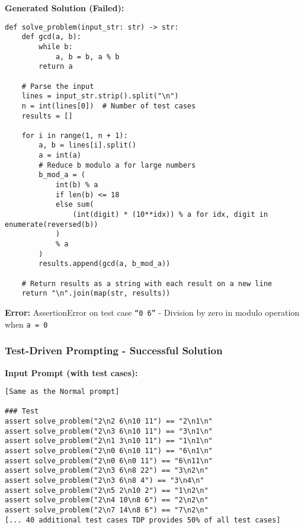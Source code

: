 \documentclass{article}
\begin{document}
\textbf{Generated Solution (Failed):}
\begin{lstlisting}
def solve_problem(input_str: str) -> str:
    def gcd(a, b):
        while b:
            a, b = b, a % b
        return a

    # Parse the input
    lines = input_str.strip().split("\n")
    n = int(lines[0])  # Number of test cases
    results = []

    for i in range(1, n + 1):
        a, b = lines[i].split()
        a = int(a)
        # Reduce b modulo a for large numbers
        b_mod_a = (
            int(b) % a
            if len(b) <= 18
            else sum(
                (int(digit) * (10**idx)) % a for idx, digit in enumerate(reversed(b))
            )
            % a
        )
        results.append(gcd(a, b_mod_a))

    # Return results as a string with each result on a new line
    return "\n".join(map(str, results))
\end{lstlisting}

\textbf{Error:} AssertionError on test case \texttt{``0 6''} - Division by zero in modulo operation when \texttt{a = 0}

\subsubsection{Test-Driven Prompting - Successful Solution}

\textbf{Input Prompt (with test cases):}
\begin{lstlisting}
[Same as the Normal prompt]

### Test
assert solve_problem("2\n2 6\n10 11") == "2\n1\n"
assert solve_problem("2\n3 6\n10 11") == "3\n1\n"
assert solve_problem("2\n1 3\n10 11") == "1\n1\n"
assert solve_problem("2\n0 6\n10 11") == "6\n1\n"
assert solve_problem("2\n0 6\n0 11") == "6\n11\n"
assert solve_problem("2\n3 6\n8 22") == "3\n2\n"
assert solve_problem("2\n3 6\n8 4") == "3\n4\n"
assert solve_problem("2\n5 2\n10 2") == "1\n2\n"
assert solve_problem("2\n4 10\n8 6") == "2\n2\n"
assert solve_problem("2\n7 14\n8 6") == "7\n2\n"
[... 40 additional test cases TDP provides 50% of all test cases]
\end{lstlisting}
\end{document}
